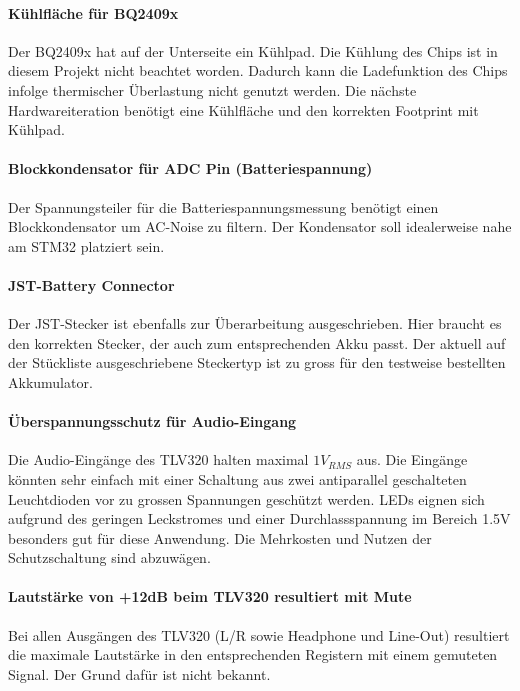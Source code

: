 \paragraph{Kühlfläche für BQ2409x}

Der BQ2409x hat auf der Unterseite ein Kühlpad. Die Kühlung des Chips ist in diesem Projekt nicht beachtet worden. Dadurch kann die Ladefunktion des Chips infolge thermischer Überlastung nicht genutzt werden. Die nächste Hardwareiteration benötigt eine Kühlfläche und den korrekten Footprint mit Kühlpad.

\paragraph{Blockkondensator für ADC Pin (Batteriespannung)}

Der Spannungsteiler für die Batteriespannungsmessung benötigt einen Blockkondensator um AC-Noise zu filtern. Der Kondensator soll idealerweise nahe am STM32 platziert sein.

\paragraph{JST-Battery Connector}

Der JST-Stecker ist ebenfalls zur Überarbeitung ausgeschrieben. Hier braucht es den korrekten Stecker, der auch zum entsprechenden Akku passt. 
Der aktuell auf der Stückliste ausgeschriebene Steckertyp ist zu gross für den testweise bestellten Akkumulator.


\paragraph{Überspannungsschutz für Audio-Eingang}

Die Audio-Eingänge des TLV320 halten maximal $1\si{V_{RMS}}$ aus. Die Eingänge könnten sehr einfach mit einer Schaltung aus zwei antiparallel geschalteten Leuchtdioden vor zu grossen Spannungen geschützt werden. LEDs eignen sich aufgrund des geringen Leckstromes und einer Durchlassspannung im Bereich 1.5V besonders gut für diese Anwendung.
Die Mehrkosten und Nutzen der Schutzschaltung sind abzuwägen.

\paragraph{Lautstärke von +12dB beim TLV320 resultiert mit Mute}

Bei allen Ausgängen des TLV320 (L/R sowie Headphone und Line-Out) resultiert die maximale Lautstärke in den entsprechenden Registern mit einem gemuteten Signal.
Der Grund dafür ist nicht bekannt.

